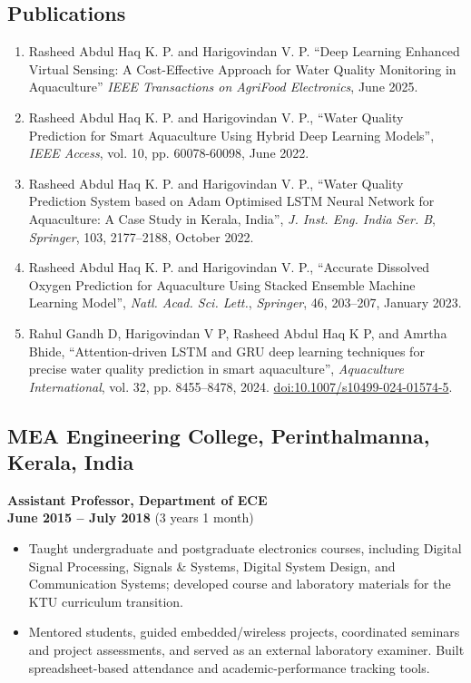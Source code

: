 \documentclass[a4paper,10pt]{article}
\begin{document}
\subsection{Publications}
\begin{enumerate}
	\item Rasheed Abdul Haq K. P. and Harigovindan V. P. \enquote{Deep Learning Enhanced Virtual Sensing: A Cost-Effective Approach for Water Quality Monitoring in Aquaculture} \textit{IEEE Transactions on AgriFood Electronics}, June 2025.
	\item Rasheed Abdul Haq K. P. and Harigovindan V. P., \enquote{Water Quality Prediction for Smart Aquaculture Using Hybrid Deep Learning Models}, \textit{IEEE Access}, vol. 10, pp. 60078-60098, June 2022. 
	\item Rasheed Abdul Haq K. P. and Harigovindan V. P., \enquote{Water Quality Prediction System based on Adam Optimised LSTM Neural Network for Aquaculture: A Case Study in Kerala, India}, \textit{J. Inst. Eng. India Ser. B}, \textit{Springer}, 103, 2177--2188, October 2022.    
	\item Rasheed Abdul Haq K. P. and Harigovindan V. P., \enquote{Accurate Dissolved Oxygen Prediction for Aquaculture Using Stacked Ensemble Machine Learning Model},  \textit{Natl. Acad. Sci. Lett.}, \textit{Springer}, 46, 203--207, January 2023. 
	\item Rahul Gandh D, Harigovindan V P, Rasheed Abdul Haq K P, and Amrtha Bhide, \enquote{Attention-driven LSTM and GRU deep learning techniques for precise water quality prediction in smart aquaculture}, \textit{Aquaculture International}, vol. 32, pp. 8455--8478, 2024. \href{https://doi.org/10.1007/s10499-024-01574-5}{doi:10.1007/s10499-024-01574-5}.
\end{enumerate}

\subsection{MEA Engineering College, Perinthalmanna, Kerala, India}
\textbf{Assistant Professor, Department of ECE} \\
\hfill \textbf{June 2015 -- July 2018} (3 years 1 month)

\begin{itemize}
\item Taught undergraduate and postgraduate electronics courses, including Digital Signal Processing, Signals \& Systems, Digital System Design, and Communication Systems; developed course and laboratory materials for the KTU curriculum transition.

\item Mentored students, guided embedded/wireless projects, coordinated seminars and project assessments, and served as an external laboratory examiner. Built spreadsheet-based attendance and academic-performance tracking tools.
\end{itemize}
\end{document}
